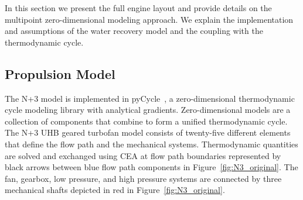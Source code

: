 \documentclass[conf]{new-aiaa}
\begin{document}
In this section we present the full engine layout and provide details on the multipoint zero-dimensional modeling approach.
We explain the implementation and assumptions of the water recovery model and the coupling with the thermodynamic cycle.

\subsection{Propulsion Model}
The N+3 model is implemented in pyCycle~\cite{Hendricks2019}, a zero-dimensional thermodynamic cycle modeling library with analytical gradients.
Zero-dimensional models are a collection of components that combine to form a unified thermodynamic cycle.
The N+3 UHB geared turbofan model consists of twenty-five different elements that define the flow path and the mechanical systems.
Thermodynamic quantities are solved and exchanged using CEA at flow path boundaries represented by black arrows between blue flow path components in Figure~\ref{fig:N3_original}.
The fan, gearbox, low pressure, and high pressure systems are connected by three mechanical shafts depicted in red in Figure~\ref{fig:N3_original}.
\end{document}
